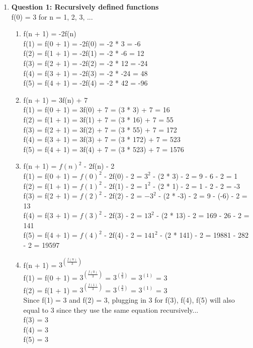 \documentclass[11pt]{article}
\begin{document}
\begin{enumerate}
\item
\textbf{Question 1: Recursively defined functions } \\ %
f(0) = 3 for n = 1, 2, 3, ...
\begin{enumerate}[label=(\alph*)]
\item %
f(n + 1) = -2f(n) \\
f(1) = f(0 + 1) = -2f(0) = -2 * 3 = -6 \\
f(2) = f(1 + 1) = -2f(1) = -2 * -6 = 12 \\
f(3) = f(2 + 1) = -2f(2) = -2 * 12 = -24 \\
f(4) = f(3 + 1) = -2f(3) = -2 * -24 = 48 \\
f(5) = f(4 + 1) = -2f(4) = -2 * 42 = -96 
\item %
f(n + 1) = 3f(n) + 7 \\
f(1) = f(0 + 1) = 3f(0) + 7 = (3 * 3) + 7 = 16 \\
f(2) = f(1 + 1) = 3f(1) + 7 = (3 * 16) + 7 = 55 \\
f(3) = f(2 + 1) = 3f(2) + 7 = (3 * 55) + 7 = 172 \\
f(4) = f(3 + 1) = 3f(3) + 7 = (3 * 172) + 7 = 523 \\
f(5) = f(4 + 1) = 3f(4) + 7 = (3 * 523) + 7 = 1576 
\item %
f(n + 1) = $f(n)^2$ - 2f(n) - 2 \\
f(1) = f(0 + 1) = $f(0)^2$ - 2f(0) - 2 = $3^2$ - (2 * 3) - 2 = 9 - 6 - 2 = 1 \\
f(2) = f(1 + 1) = $f(1)^2$ - 2f(1) - 2 = $1^2$ - (2 * 1) - 2 = 1 - 2 - 2 = -3 \\
f(3) = f(2 + 1) = $f(2)^2$ - 2f(2) - 2 = $-3^2$ - (2 * -3) - 2 = 9 - (-6) - 2 = 13 \\
f(4) = f(3 + 1) = $f(3)^2$ - 2f(3) - 2 = $13^2$ - (2 * 13) - 2 = 169 - 26 - 2 = 141 \\
f(5) = f(4 + 1) = $f(4)^2$ - 2f(4) - 2 = $141^2$ - (2 * 141) - 2 = 19881 - 282 - 2 = 19597 
\item %
f(n + 1) = $3^{(\frac{f(n)}{3})}$ \\ 
f(1) = f(0 + 1) = $3^{(\frac{f(0)}{3})}$ = $3^{(\frac{3}{3})}$ = $3^{(1)}$ = 3 \\ 
f(2) = f(1 + 1) = $3^{(\frac{f(1)}{3})}$ = $3^{(\frac{3}{3})}$ = $3^{(1)}$ = 3 \\ 
Since f(1) = 3 and f(2) = 3, plugging in 3 for f(3), f(4), f(5) will also equal to 3 since they use the same equation recursively... \\
f(3) = 3 \\
f(4) = 3 \\
f(5) = 3 
\\
\end{enumerate}


\end{enumerate}
\end{document}
